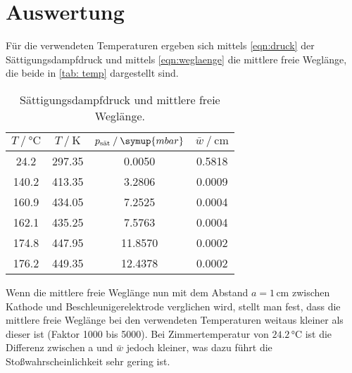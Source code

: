 \section{Auswertung}
\label{sec:Auswertung}




Für die verwendeten Temperaturen ergeben sich mittels \autoref{eqn:druck} der Sättigungsdampfdruck und mittels \autoref{eqn:weglaenge} die mittlere 
freie Weglänge, die beide in \autoref{tab: temp} dargestellt sind.
\begin{table}
    \centering
    \caption{Sättigungsdampfdruck und mittlere freie Weglänge.}
\begin{tabular}{c c c c}
    \toprule
        $T\mathbin{/}\unit{\celsius}$ &$T\mathbin{/}\unit{\kelvin}$ & $p_{\text{sät}}\mathbin{/}\symup{mbar}$ & $\bar{w} \mathbin{/} \unit{\cm}$ \\
    \midrule
    24.2 & 297.35 & 0.0050 & 0.5818\\
    140.2 & 413.35 & 3.2806 & 0.0009\\
    160.9 & 434.05 & 7.2525 & 0.0004\\
    162.1 & 435.25 & 7.5763 & 0.0004\\
    174.8 & 447.95 & 11.8570 & 0.0002 \\
    176.2 & 449.35 & 12.4378 & 0.0002 \\
     \bottomrule
    \end{tabular}
    \label{tab: temp}
\end{table}

Wenn die mittlere freie Weglänge nun mit dem Abstand $a=1\,\unit{\cm}$ zwischen Kathode und Beschleunigerelektrode verglichen wird, stellt man fest, dass die
mittlere freie Weglänge bei den verwendeten Temperaturen weitaus kleiner als dieser ist (Faktor 1000 bis 5000). Bei Zimmertemperatur von $24.2\,\unit{\celsius}$ ist die Differenz
zwischen a und $\bar{w}$ jedoch kleiner, was dazu führt die Stoßwahrscheinlichkeit sehr gering ist.


